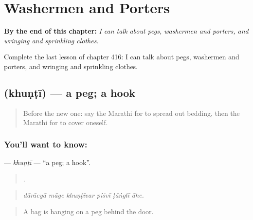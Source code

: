 
\chapter{Washermen and Porters}
\label{ch:mr-washermen-and-porters}

\begin{chapteropening}
\textbf{By the end of this chapter:} \emph{I can talk about pegs, washermen and porters, and wringing and sprinkling clothes.}

Complete the last lesson of chapter 416: I can talk about pegs, washermen and porters, and wringing and sprinkling clothes.
\end{chapteropening}

\section[\texorpdfstring{\mr{खुंटी} (khuṇṭī)}{खुंटी (khuṇṭī)}]{ (khuṇṭī) — a peg; a hook}

\label{lesson:MR-C416-khunti}



\begin{quote}
Before the new one: say the Marathi for to spread out bedding, then the Marathi for to cover oneself.
\end{quote}

\subsection*{You'll want to know: }
\textbf{} — \emph{khuṇṭī} — \textquotedblleft{}a peg; a hook\textquotedblright{}.

\begin{quote}
     .
\end{quote}

\begin{quote}
\emph{dārācyā māge khuṇṭīvar piśvī ṭāṅglī āhe.}
\end{quote}

\begin{quote}
A bag is hanging on a peg behind the door.
\end{quote}

